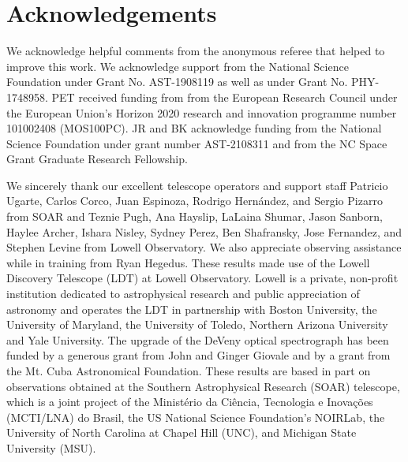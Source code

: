 \documentclass[twocolumn]{aastex631}
\begin{document}
\section{Acknowledgements}

We acknowledge helpful comments from the anonymous referee that helped to improve this work. We acknowledge support from the National Science Foundation under Grant No. AST-1908119 as well as under Grant No. PHY-1748958. PET received funding from from the European Research Council under the European Union’s Horizon 2020 research and innovation programme number 101002408 (MOS100PC). JR and BK acknowledge funding from the National Science Foundation under grant number AST-2108311 and from the NC Space Grant Graduate Research Fellowship.

We sincerely thank our excellent telescope operators and support staff Patricio Ugarte, Carlos Corco, Juan Espinoza, Rodrigo Hern\'andez, and Sergio Pizarro from SOAR and Teznie Pugh, Ana Hayslip, LaLaina Shumar, Jason Sanborn, Haylee Archer, Ishara Nisley, Sydney Perez, Ben Shafransky, Jose Fernandez, and Stephen Levine from Lowell Observatory. We also appreciate observing assistance while in training from Ryan Hegedus. These results made use of the Lowell Discovery Telescope (LDT) at Lowell Observatory. Lowell is a private, non-profit institution dedicated to astrophysical research and public appreciation of astronomy and operates the LDT in partnership with Boston University, the University of Maryland, the University of Toledo, Northern Arizona University and Yale University. The upgrade of the DeVeny optical spectrograph has been funded by a generous grant from John and Ginger Giovale and by a grant from the Mt. Cuba Astronomical Foundation. These results are based in part on observations obtained at the Southern Astrophysical Research (SOAR) telescope, which is a joint project of the Minist\'{e}rio da Ci\^{e}ncia, Tecnologia e Inova\c{c}\~{o}es (MCTI/LNA) do Brasil, the US National Science Foundation’s NOIRLab, the University of North Carolina at Chapel Hill (UNC), and Michigan State University (MSU).

{}


\appendix
\restartappendixnumbering
\end{document}
